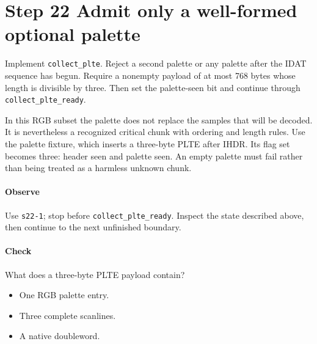 \section{Step 22 Admit only a well-formed optional palette}\label{png-collect-s22}
Implement \texttt{collect\_plte}. Reject a second palette or any palette after the IDAT sequence has begun. Require a nonempty payload of at most 768 bytes whose length is divisible by three. Then set the palette-seen bit and continue through \texttt{collect\_plte\_ready}.

In this RGB subset the palette does not replace the samples that will be decoded. It is nevertheless a recognized critical chunk with ordering and length rules. Use the palette fixture, which inserts a three-byte PLTE after IHDR. Its flag set becomes three: header seen and palette seen. An empty palette must fail rather than being treated as a harmless unknown chunk.

\paragraph{Observe} Use \texttt{s22-1}; stop before \texttt{collect\_plte\_ready}. Inspect the state described above, then continue to the next unfinished boundary.

\paragraph{Check} What does a three-byte PLTE payload contain?
\begin{itemize}
  \item[A.] One RGB palette entry.
  \item[B.] Three complete scanlines.
  \item[C.] A native doubleword.
\end{itemize}
